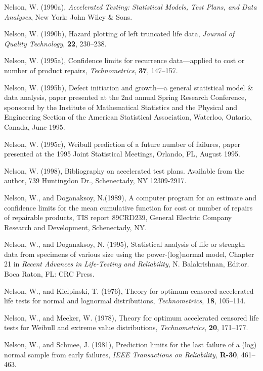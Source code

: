 \begin{thebibliography}{999}
Nelson, W. (1990a), {\em Accelerated Testing: Statistical Models, Test
Plans, and Data Analyses}, New York: John
Wiley \& Sons.

Nelson, W. (1990b), Hazard plotting of left truncated life data,
{\em Journal of Quality Technology}, {\bf 22},
230--238.

Nelson, W. (1995a), Confidence limits for recurrence data---applied to
cost or number of product repairs, {\em Technometrics}, {\bf 37},
147--157.

Nelson, W. (1995b), Defect initiation and growth---a general statistical
model \& data analysis, paper presented at the 2nd annual Spring
Research Conference, sponsored by the Institute of Mathematical
Statistics and the Physical and Engineering Section of the American
Statistical Association, Waterloo, Ontario, Canada, June 1995.

Nelson, W. (1995c), Weibull prediction of a future number of failures,
paper presented at the 1995 Joint Statistical Meetings, Orlando, FL,
August 1995.

Nelson, W. (1998), Bibliography on accelerated test plans.
Available from the author, 739 Huntingdon Dr., Schenectady, NY 12309-2917.

Nelson, W., and Doganaksoy, N.(1989), A computer program for an
estimate and confidence limits for the mean cumulative function for
cost or number of repairs of repairable products, TIS report 89CRD239,
General Electric Company Research and Development, Schenectady, NY.

Nelson, W., and Doganaksoy, N. (1995), Statistical analysis of life or
strength data from specimens of various size using the
power-(log)normal model, Chapter 21 in {\em Recent Advances in
Life-Testing and Reliability}, N. Balakrishnan, Editor. Boca Raton,
FL: CRC Press.

Nelson, W., and Kielpinski, T. (1976), Theory for optimum censored
accelerated life tests for normal and lognormal distributions, {\em
Technometrics}, {\bf 18}, 105--114.

Nelson, W., and Meeker, W. (1978), Theory for optimum accelerated
censored life tests for Weibull and extreme value distributions, {\em
Technometrics}, {\bf 20}, 171--177.

Nelson, W., and Schmee, J. (1981), Prediction limits for the last
failure of a (log) normal sample from early failures, {\em IEEE
Transactions  on Reliability, } {\bf R-30}, 461--463.



\end{thebibliography}
